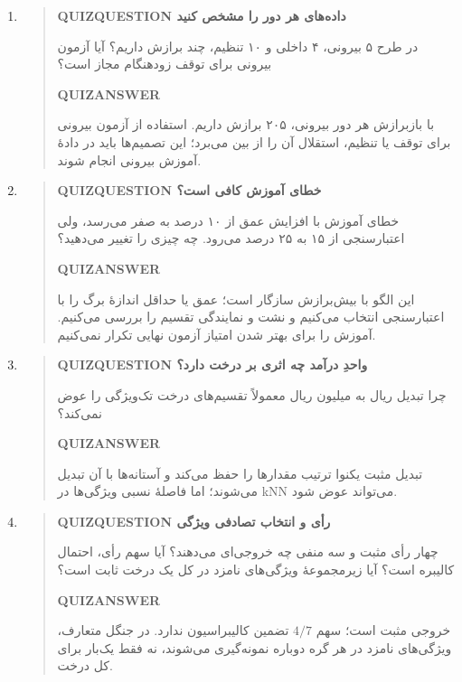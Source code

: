 \begin{enumerate}
\begin{quote}
\end{quote}
\item\begin{quote}\textbf{QUIZQUESTION داده‌های هر دور را مشخص کنید}\par 
در طرح ۵ بیرونی، ۴ داخلی و ۱۰ تنظیم، چند برازش داریم؟ آیا آزمون بیرونی برای توقف زودهنگام مجاز است؟
\par\textbf{QUIZANSWER}\par با بازبرازش هر دور بیرونی، ۲۰۵ برازش داریم. استفاده از آزمون بیرونی برای توقف یا تنظیم، استقلال آن را از بین می‌برد؛ این تصمیم‌ها باید در دادهٔ آموزش بیرونی انجام شوند.\par 
\end{quote}
\item\begin{quote}\textbf{QUIZQUESTION خطای آموزش کافی است؟}\par 
خطای آموزش با افزایش عمق از ۱۰ درصد به صفر می‌رسد، ولی اعتبارسنجی از ۱۵ به ۲۵ درصد می‌رود. چه چیزی را تغییر می‌دهید؟
\par\textbf{QUIZANSWER}\par این الگو با بیش‌برازش سازگار است؛ عمق یا حداقل اندازهٔ برگ را با اعتبارسنجی انتخاب می‌کنیم و نشت و نمایندگی تقسیم را بررسی می‌کنیم. آموزش را برای بهتر شدن امتیاز آزمون نهایی تکرار نمی‌کنیم.\par 
\end{quote}
\item\begin{quote}\textbf{QUIZQUESTION واحدِ درآمد چه اثری بر درخت دارد؟}\par 
چرا تبدیل ریال به میلیون ریال معمولاً تقسیم‌های درخت تک‌ویژگی را عوض نمی‌کند؟
\par\textbf{QUIZANSWER}\par تبدیل مثبت یکنوا ترتیب مقدارها را حفظ می‌کند و آستانه‌ها با آن تبدیل می‌شوند؛ اما فاصلهٔ نسبی ویژگی‌ها در kNN می‌تواند عوض شود.\par 
\end{quote}
\item\begin{quote}\textbf{QUIZQUESTION رأی و انتخاب تصادفی ویژگی}\par 
چهار رأی مثبت و سه منفی چه خروجی‌ای می‌دهند؟ آیا سهم رأی، احتمال کالیبره است؟ آیا زیرمجموعهٔ ویژگی‌های نامزد در کل یک درخت ثابت است؟
\par\textbf{QUIZANSWER}\par خروجی مثبت است؛ سهم $4/7$ تضمین کالیبراسیون ندارد. در جنگل متعارف، ویژگی‌های نامزد در هر گره دوباره نمونه‌گیری می‌شوند، نه فقط یک‌بار برای کل درخت.\par 

\end{quote}
\end{enumerate}
